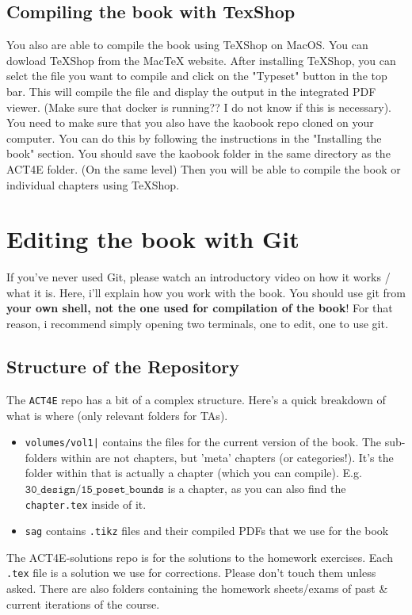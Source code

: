 \documentclass{article}
\begin{document}
\subsection{Compiling the book with TexShop}
You also are able to compile the book using TeXShop on MacOS. You can dowload TeXShop from the MacTeX website. After installing TeXShop, you can selct the file you want to compile and click on the "Typeset" button in the top bar. This will compile the file and display the output in the integrated PDF viewer. (Make sure that docker is running?? I do not know if this is necessary). You need to make sure that you also have the kaobook repo cloned on your computer. You can do this by following the instructions in the "Installing the book" section. You should save the kaobook folder in the same directory as the ACT4E folder. (On the same level) Then you will be able to compile the book or individual chapters using TeXShop.

\section{Editing the book with Git}
If you've never used Git, please watch an introductory video on how it works / what it is. Here, i'll explain how you work with the book. You should use git from \textbf{your own shell, not the one used for compilation of the book}! For that reason, i recommend simply opening two terminals, one to edit, one to use git.
\subsection{Structure of the Repository}
The \texttt{ACT4E} repo has a bit of a complex structure. Here's a quick breakdown of what is where (only relevant folders for TAs).
\begin{itemize}
    \item \texttt{volumes/vol1|} contains the files for the current version of the book. The sub-folders within are not chapters, but 'meta' chapters (or categories!). It's the folder within that is actually a chapter (which you can compile). E.g. $\texttt{30\_design/15\_poset\_bounds}$ is a chapter, as you can also find the \texttt{chapter.tex} inside of it.
    \item \texttt{sag} contains \texttt{.tikz} files and their compiled PDFs that we use for the book
\end{itemize}
The ACT4E-solutions repo is for the solutions to the homework exercises. Each \texttt{.tex} file is a solution we use for corrections. Please don't touch them unless asked. There are also folders containing the homework sheets/exams of past \& current iterations of the course.
\end{document}
